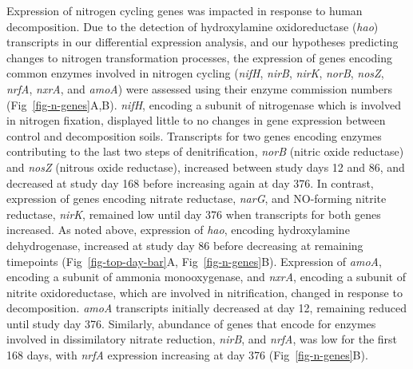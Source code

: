 \documentclass[
  sn-nature,
  lineno, referee]{sn-jnl}
\begin{document}
Expression of nitrogen cycling genes was impacted in response to human
decomposition. Due to the detection of hydroxylamine oxidoreductase
(\emph{hao}) transcripts in our differential expression analysis, and
our hypotheses predicting changes to nitrogen transformation processes,
the expression of genes encoding common enzymes involved in nitrogen
cycling (\emph{nifH}, \emph{nirB}, \emph{nirK}, \emph{norB},
\emph{nosZ}, \emph{nrfA}, \emph{nxrA}, and \emph{amoA}) were assessed
using their enzyme commission numbers (Fig~\ref{fig-n-genes}A,B).
\emph{nifH}, encoding a subunit of nitrogenase which is involved in
nitrogen fixation, displayed little to no changes in gene expression
between control and decomposition soils. Transcripts for two genes
encoding enzymes contributing to the last two steps of denitrification,
\emph{norB} (nitric oxide reductase) and \emph{nosZ} (nitrous oxide
reductase), increased between study days 12 and 86, and decreased at
study day 168 before increasing again at day 376. In contrast,
expression of genes encoding nitrate reductase, \emph{narG}, and
NO-forming nitrite reductase, \emph{nirK}, remained low until day 376
when transcripts for both genes increased. As noted above, expression of
\emph{hao}, encoding hydroxylamine dehydrogenase, increased at study day
86 before decreasing at remaining timepoints
(Fig~\ref{fig-top-day-bar}A, Fig~\ref{fig-n-genes}B). Expression of
\emph{amoA}, encoding a subunit of ammonia monooxygenase, and
\emph{nxrA}, encoding a subunit of nitrite oxidoreductase, which are
involved in nitrification, changed in response to decomposition.
\emph{amoA} transcripts initially decreased at day 12, remaining reduced
until study day 376. Similarly, abundance of genes that encode for
enzymes involved in dissimilatory nitrate reduction, \emph{nirB}, and
\emph{nrfA}, was low for the first 168 days, with \emph{nrfA} expression
increasing at day 376 (Fig~\ref{fig-n-genes}B).
\end{document}
